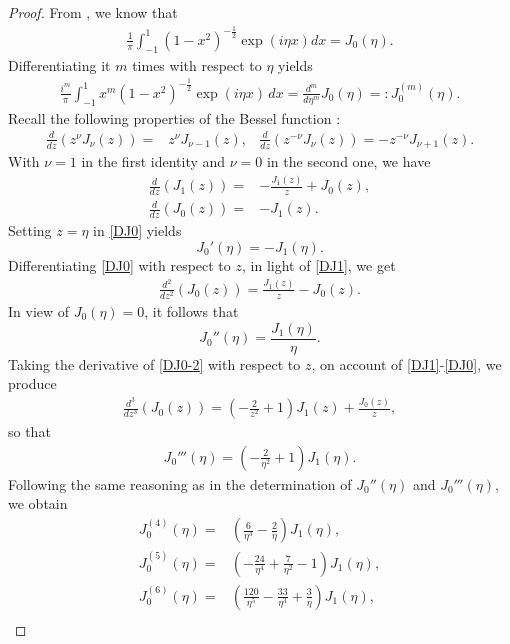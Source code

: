 \documentclass[11pt,a4paper]{article}
\numberwithin{equation}{section}
\begin{document}
{\begin{appendices}
\begin{proof}
From \cite[eq. 10, p. 912]{GR}, we know that
\begin{align}\label{bsint}
\frac{1}{\pi}\int_{-1}^1(1-x^2)^{-\frac{1}{2}}\exp(i\eta x)dx=J_0(\eta).
\end{align}
Differentiating it $m$ times with respect to $\eta$ yields
\begin{align}\label{DJ0m}
\frac{i^m}{\pi}\int_{-1}^{1}x^{m}(1-x^2)^{-\frac{1}{2}}\exp(\mathit{i}\eta x)\, dx=\frac{d^m}{d\eta^m}J_0(\eta)=:J_0^{(m)}(\eta).
\end{align}
Recall the following properties of the Bessel function \cite[(5.3.7)]{Lebedev}:
\begin{align*}
\frac{d}{dz}(z^{\nu}J_{\nu}(z))=&z^{\nu}J_{\nu-1}(z),&\frac{d}{dz}(z^{-\nu}J_{\nu}(z))=-z^{-\nu}J_{\nu+1}(z).
\end{align*}
With $\nu=1$ in the first identity and $\nu=0$ in the second one, we have
\begin{align}
\frac{d}{dz}(J_{1}(z))=&-\frac{J_1(z)}{z}+J_{0}(z),\label{DJ1}\\
\frac{d}{dz}(J_{0}(z))=&-J_{1}(z).\label{DJ0}
\end{align}
Setting $z=\eta$ in \eqref{DJ0} yields
\[J_0'(\eta)=-J_1(\eta).\]
 Differentiating \eqref{DJ0} with respect to $z$, in light of \eqref{DJ1}, we get
\begin{align}\label{DJ0-2}
\frac{d^2}{dz^2}(J_{0}(z))=\frac{J_1(z)}{z}-J_{0}(z).
\end{align}
In view of $J_0(\eta)=0$, it follows that
\[J_{0}''(\eta)=\frac{J_1(\eta)}{\eta}.\]
Taking the derivative of \eqref{DJ0-2} with respect to $z$, on account of \eqref{DJ1}-\eqref{DJ0}, we produce
\begin{align}\label{DJ0-3}
\frac{d^3}{dz^3}(J_{0}(z))=\left(-\frac{2}{z^2}+1\right)J_1(z)+\frac{J_0(z)}{z},
\end{align}
so that
\begin{align*}
J_{0}'''(\eta)=\left(-\frac{2}{\eta^2}+1\right)J_1(\eta).
\end{align*}
Following the same reasoning as in the determination of $J_0''(\eta)$ and $J_0'''(\eta)$, we obtain
\begin{align*}
J_0^{(4)}(\eta)=&\left(\frac{6}{\eta^3}-\frac{2}{\eta}\right)J_1(\eta),\\
J_0^{(5)}(\eta)=&\left(-\frac{24}{\eta^4}+\frac{7}{\eta^2}-1\right)J_1(\eta),\\
J_0^{(6)}(\eta)=&\left(\frac{120}{\eta^5}-\frac{33}{\eta^3}+\frac{3}{\eta}\right)J_1(\eta),\\

\end{align*}
\end{proof}
\end{appendices}}
\end{document}
